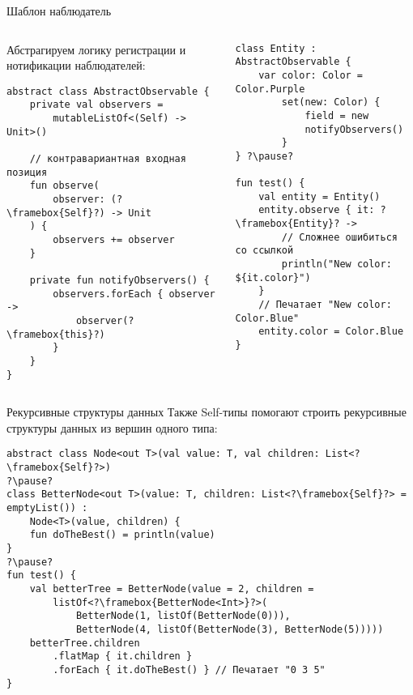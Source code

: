 \documentclass[handout,aspectratio=169,usenames,dvipsnames]{beamer}
\begin{document}
\begin{frame}[fragile]{Шаблон наблюдатель}
    \begin{columns}
        \begin{column}{0.48\textwidth}
            Абстрагируем логику регистрации и нотификации наблюдателей:
            \begin{verbatim}
abstract class AbstractObservable {
    private val observers =
        mutableListOf<(Self) -> Unit>()

    // контравариантная входная позиция
    fun observe(
        observer: (?\framebox{Self}?) -> Unit
    ) {
        observers += observer
    }

    private fun notifyObservers() {
        observers.forEach { observer ->
            observer(?\framebox{this}?)
        }
    }
}
            \end{verbatim}
        \end{column}
        \pause
        \begin{column}{0.50\textwidth}
            \vspace{-0.5em}
            \begin{verbatim}
class Entity : AbstractObservable {
    var color: Color = Color.Purple
        set(new: Color) {
            field = new
            notifyObservers()
        }
} ?\pause?

fun test() {
    val entity = Entity()
    entity.observe { it: ?\framebox{Entity}? ->
        // Сложнее ошибиться со ссылкой
        println("New color: ${it.color}")
    }
    // Печатает "New color: Color.Blue"
    entity.color = Color.Blue
}
            \end{verbatim}
        \end{column}
    \end{columns}
\end{frame}

\begin{frame}[fragile]{Рекурсивные структуры данных}
    Также Self-типы помогают строить рекурсивные структуры данных из вершин одного типа:
    \begin{verbatim}
abstract class Node<out T>(val value: T, val children: List<?\framebox{Self}?>)
?\pause?
class BetterNode<out T>(value: T, children: List<?\framebox{Self}?> = emptyList()) :
    Node<T>(value, children) {
    fun doTheBest() = println(value)
}
?\pause?
fun test() {
    val betterTree = BetterNode(value = 2, children =
        listOf<?\framebox{BetterNode<Int>}?>(
            BetterNode(1, listOf(BetterNode(0))),
            BetterNode(4, listOf(BetterNode(3), BetterNode(5)))))
    betterTree.children
        .flatMap { it.children }
        .forEach { it.doTheBest() } // Печатает "0 3 5"
}
    \end{verbatim}
\end{frame}
\end{document}
